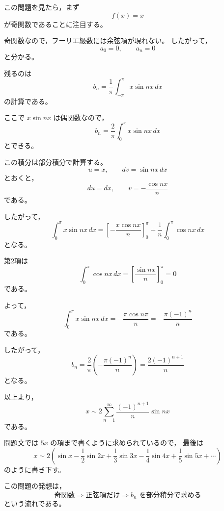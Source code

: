 \begin{strategy}
	この問題を見たら，まず
	\[
	f(x)=x
	\]
	が奇関数であることに注目する。
	
	奇関数なので，フーリエ級数には余弦項が現れない。
	したがって，
	\[
	a_0=0,\qquad a_n=0
	\]
	と分かる。
	
	残るのは
	\[
	b_n=\frac{1}{\pi}\int_{-\pi}^{\pi}x\sin nx\,dx
	\]
	の計算である。
	
	ここで \(x\sin nx\) は偶関数なので，
	\[
	b_n=\frac{2}{\pi}\int_0^\pi x\sin nx\,dx
	\]
	とできる。
	
	この積分は部分積分で計算する。
	\[
	u=x,\qquad dv=\sin nx\,dx
	\]
	とおくと，
	\[
	du=dx,\qquad v=-\frac{\cos nx}{n}
	\]
	である。
	
	したがって，
	\[
	\int_0^\pi x\sin nx\,dx
	=
	\left[-\frac{x\cos nx}{n}\right]_0^\pi
	+
	\frac{1}{n}\int_0^\pi \cos nx\,dx
	\]
	となる。
	
	第2項は
	\[
	\int_0^\pi \cos nx\,dx
	=
	\left[\frac{\sin nx}{n}\right]_0^\pi
	=0
	\]
	である。
	
	よって，
	\[
	\int_0^\pi x\sin nx\,dx
	=
	-\frac{\pi\cos n\pi}{n}
	=
	-\frac{\pi(-1)^n}{n}
	\]
	である。
	
	したがって，
	\[
	b_n
	=
	\frac{2}{\pi}
	\left(
	-\frac{\pi(-1)^n}{n}
	\right)
	=
	\frac{2(-1)^{n+1}}{n}
	\]
	となる。
	
	以上より，
	\[
	x\sim
	2\sum_{n=1}^{\infty}
	\frac{(-1)^{n+1}}{n}\sin nx
	\]
	である。
	
	問題文では \(5x\) の項まで書くように求められているので，
	最後は
	\[
	x\sim
	2\left(
	\sin x-\frac{1}{2}\sin 2x
	+\frac{1}{3}\sin 3x
	-\frac{1}{4}\sin 4x
	+\frac{1}{5}\sin 5x
	+\cdots
	\right)
	\]
	のように書き下す。
	
	この問題の発想は，
	\[
	\text{奇関数}
	\Rightarrow
	\text{正弦項だけ}
	\Rightarrow
	b_n\text{ を部分積分で求める}
	\]
	という流れである。
\end{strategy}